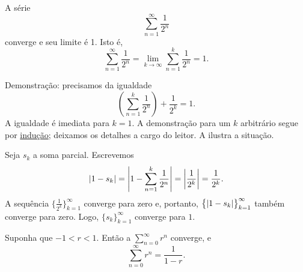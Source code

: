 \begin{example}
A série
\begin{equation*}
\sum_{n=1}^\infty \frac{1}{2^n}
\end{equation*}
converge e seu limite é 1. Isto é,
\begin{equation*}
\sum_{n=1}^\infty \frac{1}{2^n} = 
\lim_{k\to\infty} \sum_{n=1}^k \frac{1}{2^n} = 
1 .
\end{equation*}

Demonstração: precisamos da igualdade
\begin{equation*}
\left( \sum_{n=1}^k \frac{1}{2^n} \right)
+ \frac{1}{2^k}
= 1 .
\end{equation*}
A igualdade é imediata para $k=1$. A demonstração para um $k$ arbitrário
segue por \hyperref[induction:thm]{indução}; deixamos os detalhes a cargo do
leitor. A  ilustra a situação.
\begin{myfigureht}
\caption{A igualdade 
$\left( \sum_{n=1}^k \frac{1}{2^n} \right)
+ \frac{1}{2^k}
= 1$ ilustrada para $k=3$.\label{figcutseries}}
\end{myfigureht}

Seja $s_k$ a soma parcial. Escrevemos
\begin{equation*}
\lvert {
1 - s_k 
} \rvert
=
\left\lvert {
1 - 
\sum_{n=1}^k \frac{1}{2^n}
} \right\rvert
=
\left\lvert {\frac{1}{2^k}} \right\rvert = 
\frac{1}{2^k} .
\end{equation*}
A sequência $\bigl\{ \frac{1}{2^k} \bigr\}_{k=1}^\infty$ converge para zero e, portanto,
$\bigl\{ \lvert {1-s_k} \rvert \bigr\}_{k=1}^\infty$ também converge para zero.
Logo, $\{ s_k \}_{k=1}^\infty$ converge para $1$.
\end{example}

\begin{prop} \label{geometric:prop}
Suponha que
$-1 < r < 1$. Então a \emph{}
$\sum_{n=0}^\infty r^n$ converge, e
\begin{equation*}
\sum_{n=0}^\infty r^n = \frac{1}{1-r} .
\end{equation*}
\end{prop}

